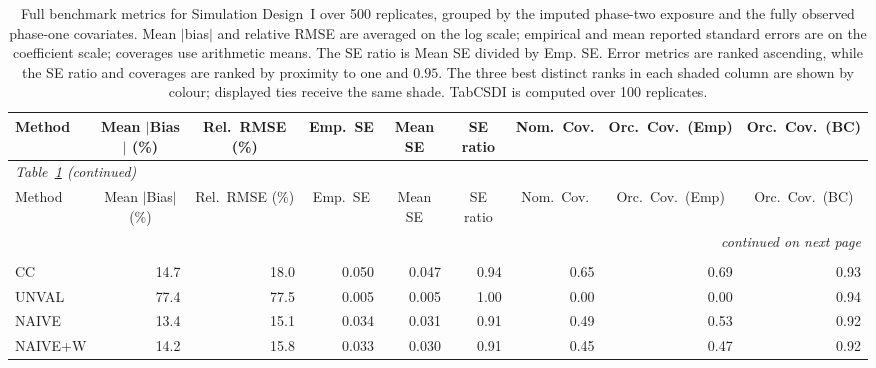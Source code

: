 \begin{landscape}
\footnotesize\setlength{\tabcolsep}{3.5pt}
\begin{longtable}{lrrrrrrrr}
\caption{Full benchmark metrics for Simulation Design~I over 500 replicates, grouped by the imputed phase-two exposure and the fully observed phase-one covariates. Mean $|$bias$|$ and relative RMSE are averaged on the log scale; empirical and mean reported standard errors are on the coefficient scale; coverages use arithmetic means. The SE ratio is Mean SE divided by Emp. SE. Error metrics are ranked ascending, while the SE ratio and coverages are ranked by proximity to one and $0.95$. The three best distinct ranks in each shaded column are shown by colour; displayed ties receive the same shade. TabCSDI is computed over 100 replicates.}
\label{tab:appc_sisl} \\
\toprule
Method & \multicolumn{1}{c}{Mean $|$Bias$|$ (\%)} & \multicolumn{1}{c}{Rel.\ RMSE (\%)} & \multicolumn{1}{c}{Emp.\ SE} & \multicolumn{1}{c}{Mean SE} & \multicolumn{1}{c}{SE ratio} & \multicolumn{1}{c}{Nom.\ Cov.} & \multicolumn{1}{c}{Orc.\ Cov.\ (Emp)} & \multicolumn{1}{c}{Orc.\ Cov.\ (BC)} \\
\midrule \endfirsthead
\multicolumn{9}{l}{\footnotesize\itshape Table~\ref{tab:appc_sisl} (continued)} \\ \toprule
Method & \multicolumn{1}{c}{Mean $|$Bias$|$ (\%)} & \multicolumn{1}{c}{Rel.\ RMSE (\%)} & \multicolumn{1}{c}{Emp.\ SE} & \multicolumn{1}{c}{Mean SE} & \multicolumn{1}{c}{SE ratio} & \multicolumn{1}{c}{Nom.\ Cov.} & \multicolumn{1}{c}{Orc.\ Cov.\ (Emp)} & \multicolumn{1}{c}{Orc.\ Cov.\ (BC)} \\
\midrule \endhead
\midrule \multicolumn{9}{r}{\footnotesize\itshape continued on next page} \\
\endfoot
\bottomrule \endlastfoot
\multicolumn{9}{l}{\textbf{Continuous Phase-Two Covariates}} \\
\addlinespace[2pt]
CC & 14.7 & 18.0 & 0.050 & 0.047 & 0.94 & 0.65 & 0.69 & \cellcolor{rankthree}0.93 \\
UNVAL & 77.4 & 77.5 & 0.005 & 0.005 & \cellcolor{rankone}1.00 & 0.00 & 0.00 & \cellcolor{ranktwo}0.94 \\
NAIVE & 13.4 & 15.1 & 0.034 & 0.031 & 0.91 & 0.49 & 0.53 & 0.92 \\
NAIVE+W & 14.2 & 15.8 & 0.033 & 0.030 & 0.91 & 0.45 & 0.47 & 0.92 \\

\end{longtable}
\end{landscape}
